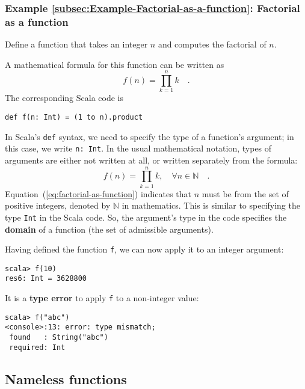 \subsubsection{Example \label{subsec:Example-Factorial-as-a-function}\ref{subsec:Example-Factorial-as-a-function}:
Factorial as a function}

Define a function that takes an integer $n$ and computes the factorial
of $n$.

A mathematical formula for this function can be written as
\[
f\left(n\right)=\prod_{k=1}^{n}k\quad.
\]
The corresponding Scala code is
\begin{lstlisting}
def f(n: Int) = (1 to n).product
\end{lstlisting}

In Scala\textsf{'}s \texttt{}\lstinline!def! syntax, we need to specify the
type of a function\textsf{'}s argument; in this case, we write \lstinline!n: Int!.
In the usual mathematical notation, types of arguments are either
not written at all, or written separately from the formula:
\begin{equation}
f(n)=\prod_{k=1}^{n}k,\quad\forall n\in\mathbb{N}\quad.\label{eq:factorial-as-function}
\end{equation}
Equation~(\ref{eq:factorial-as-function}) indicates that $n$ must
be from the set of positive integers, denoted by $\mathbb{N}$ in
mathematics. This is similar to specifying the type \texttt{}\lstinline!Int!
in the Scala code. So, the argument\textsf{'}s type in the code specifies the
\textbf{domain} of a function (the set
of admissible arguments).

Having defined the function \lstinline!f!, we can now apply it to
an integer argument: 
\begin{lstlisting}
scala> f(10)
res6: Int = 3628800
\end{lstlisting}
It is a \textbf{type error} to apply \lstinline!f!
to a non-integer value:
\begin{lstlisting}
scala> f("abc")
<console>:13: error: type mismatch;
 found   : String("abc")
 required: Int
\end{lstlisting}


\subsection{Nameless functions\label{subsec:Nameless-functions}}

